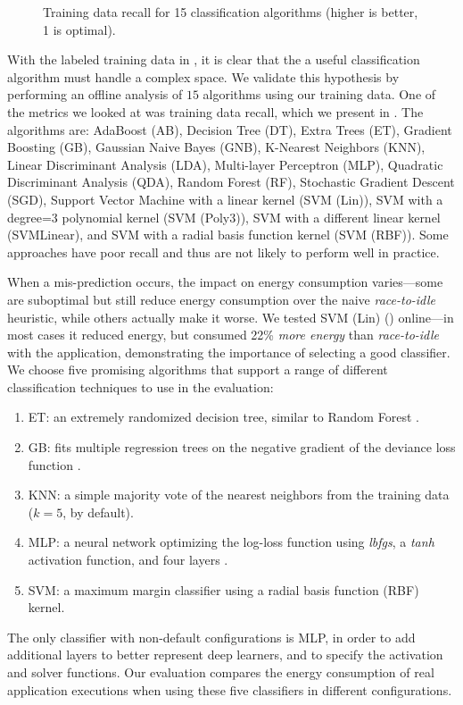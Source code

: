 \begin{figure}[t]
  \begin{centering}
    
    \caption{Training data recall for 15 classification algorithms (higher is better, 1 is optimal).}
    \label{fig:recall}
  \end{centering}
\end{figure}

With the labeled training data in , it is clear that the a useful classification algorithm must handle a complex space.
We validate this hypothesis by performing an offline analysis of $15$ algorithms using our training data.
One of the metrics we looked at was training data recall, which we present in .
The algorithms are: AdaBoost (AB), Decision Tree (DT), Extra Trees (ET), Gradient Boosting (GB), Gaussian Naive Bayes (GNB), K-Nearest Neighbors (KNN), Linear Discriminant Analysis (LDA), Multi-layer Perceptron (MLP), Quadratic Discriminant Analysis (QDA), Random Forest (RF), Stochastic Gradient Descent (SGD), Support Vector Machine with a linear kernel (SVM (Lin)), SVM with a degree=3 polynomial kernel (SVM (Poly3)), SVM with a different linear kernel (SVMLinear), and SVM with a radial basis function kernel (SVM (RBF)).
Some approaches have poor recall and thus are not likely to perform well in practice.

When a mis-prediction occurs, the impact on energy consumption varies---some are suboptimal but still reduce energy consumption over the naive \emph{race-to-idle} heuristic, while others actually make it worse.
We tested SVM (Lin) () online---in most cases it reduced energy, but consumed 22\% \emph{more energy} than \emph{race-to-idle} with the  application, demonstrating the importance of selecting a good classifier.
We choose five promising algorithms that support a range of different classification techniques to use in the evaluation:
\begin{enumerate}
\item ET: an extremely randomized decision tree, similar to Random Forest \cite{Geurts2006ExtraTrees}.
\item GB: fits multiple regression trees on the negative gradient of the deviance loss function \cite{friedman2001GradientBoosting,scikit-learn}.%
\item KNN: a simple majority vote of the nearest neighbors from the training data ($k=5$, by default).
\item MLP: a neural network optimizing the log-loss function using \emph{lbfgs}, a \emph{tanh} activation function, and four layers \cite{HintonMultiLayerPerceptron}.
\item SVM: a maximum margin classifier using a radial basis function (RBF) kernel.
\end{enumerate}
The only classifier with non-default configurations is MLP, in order to add additional layers to better represent deep learners, and to specify the activation and solver functions.
Our evaluation compares the energy consumption of real application executions when using these five classifiers in different configurations.
